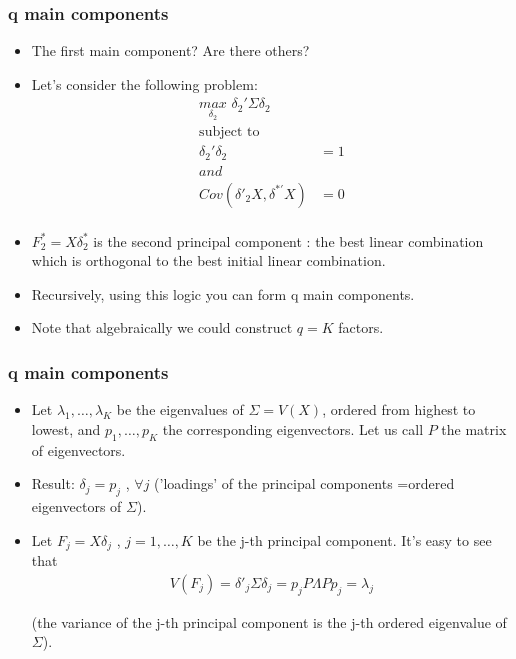 \documentclass[
  shownotes,
  xcolor={svgnames},
  hyperref={colorlinks,citecolor=DarkBlue,linkcolor=DarkRed,urlcolor=DarkBlue}
  , aspectratio=169]{beamer}
\begin{document}
\begin{frame}
\frametitle{q main components}

\begin{itemize}

\item The first main component? Are there others?

\item Let's consider the following problem:
\begin{align}
\underset{\delta_2}{max}\,\, \delta_2' \Sigma \delta_2 \\ \nonumber
\text{subject to}  \\ \nonumber
\delta_2' \delta_2 &= 1 \\ \nonumber
and \\ \nonumber
Cov(\delta'_2 X,\delta^{*'}X) &=0 \\ \nonumber
\end{align}

\item $F_2^*=X\delta^*_2$ is the second principal component : the best linear combination which is
orthogonal to the best initial linear combination.
\item Recursively, using this logic you can form q  main components. 
\item Note that algebraically we could construct $q = K$ factors.
\end{itemize}
\end{frame}

\begin{frame}
\frametitle{q main components}

\begin{itemize}
\item Let $\lambda_1,\dots,\lambda_K$ be the eigenvalues of $\Sigma = V(X)$, ordered from highest to lowest, and $p_1 , \dots , p_K$ the corresponding eigenvectors. Let us call $P$ the matrix of eigenvectors.
\medskip
\item Result: $\delta_j = p_j$ , $\forall j$ ('loadings' of the principal components =ordered eigenvectors of $\Sigma$).
\medskip
\item Let $F_j = X \delta_j$ , $j = 1, \dots, K$ be the j-th principal component. It's easy to see that
\begin{align}
V (F_j ) = \delta'_j \Sigma \delta_j = p_j P\Lambda P p_j = \lambda_j
\end{align}

(the variance of the j-th principal component is the j-th ordered eigenvalue of $\Sigma$).
\end{itemize}


\end{frame}
\end{document}
